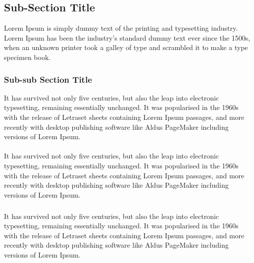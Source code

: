 \documentclass{article}
\begin{document}
\subsection{Sub-Section Title}
Lorem Ipsum is simply dummy text of the printing and typesetting industry. 
Lorem Ipsum has been the industry's standard dummy text ever since the 1500s, 
when an unknown printer took a galley of type and scrambled it to make a type 
specimen book. 

\subsubsection{Sub-sub Section Title}
It has survived not only five centuries, but also the leap into electronic 
typesetting, remaining essentially unchanged. It was popularised in the 1960s 
with the release of Letraset sheets containing Lorem Ipsum passages, and more 
recently with desktop publishing software like Aldus PageMaker including 
versions of Lorem Ipsum.

\paragraph{}
It has survived not only five centuries, but also the leap into electronic 
typesetting, remaining essentially unchanged. It was popularised in the 1960s 
with the release of Letraset sheets containing Lorem Ipsum passages, and more 
recently with desktop publishing software like Aldus PageMaker including 
versions of Lorem Ipsum.

\subparagraph{}
It has survived not only five centuries, but also the leap into electronic 
typesetting, remaining essentially unchanged. It was popularised in the 1960s 
with the release of Letraset sheets containing Lorem Ipsum passages, and more 
recently with desktop publishing software like Aldus PageMaker including 
versions of Lorem Ipsum.


	
\end{document}
